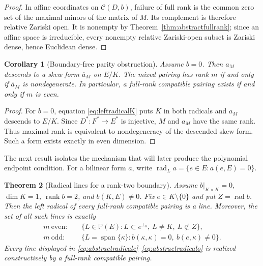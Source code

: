 \documentclass[11pt,a4paper]{article}
\newtheorem{theorem}{Theorem}[section]
\newtheorem{corollary}[theorem]{Corollary}
\theoremstyle{definition}
\theoremstyle{remark}
\newcommand{\Pp}{\mathbb{P}}
\newcommand{\rank}{\operatorname{rank}}
\newcommand{\Rad}{\operatorname{rad}}
\newcommand{\spanof}{\operatorname{span}}
\newcommand{\cC}{\mathcal{C}}
\begin{document}
\begin{proof}
In affine coordinates on $\cC(D,b)$, failure of full rank is the common zero set of the
maximal minors of the matrix of $M$.  Its complement is therefore relative Zariski open.
It is nonempty by Theorem~\ref{thm:abstractfullrank}; since an affine space is irreducible,
every nonempty relative Zariski-open subset is Zariski dense, hence Euclidean dense.
\end{proof}

\begin{corollary}[Boundary-free parity obstruction]\label{cor:parityobstruction}
Assume $b=0$.  Then $a_M$ descends to a skew form $\overline a_M$ on $E/K$.  The mixed
pairing has rank $m$ if and only if $\overline a_M$ is nondegenerate.  In particular, a
full-rank compatible pairing exists if and only if $m$ is even.
\end{corollary}

\begin{proof}
For $b=0$, equation \eqref{eq:leftradicalK} puts $K$ in both radicals and $a_M$ descends to
$E/K$.  Since $D^*:F^*\to E^*$ is injective, $M$ and $a_M$ have the same rank.  Thus maximal
rank is equivalent to nondegeneracy of the descended skew form.  Such a form exists exactly
in even dimension.
\end{proof}

The next result isolates the mechanism that will later produce the polynomial endpoint
condition.  For a bilinear form $a$, write
$\Rad_La=\{e\in E:a(e,E)=0\}$.

\begin{theorem}[Radical lines for a rank-two boundary]
\label{thm:abstractradical}
Assume $b|_{K\times K}=0$, $\dim K=1$, $\rank b=2$, and $b(K,E)\neq0$.  Fix
$e\in K\setminus\{0\}$ and put $Z=\Rad b$.  Then the left radical of every full-rank
compatible pairing is a line.  Moreover, the set of all such lines is exactly
\begin{align}
 m\ \text{even}:\quad&
 \bigl\{L\in\Pp(E):L\subset e^{\perp_b},\ L\neq K,\ L\not\subset Z\bigr\},
 \label{eq:abstractradicale}\\[2mm]
 m\ \text{odd}:\quad&
 \bigl\{L=\spanof\{\kappa\}:b(\kappa,\kappa)=0,\ b(e,\kappa)\neq0\bigr\}.
 \label{eq:abstractradicalo}
\end{align}
Every line displayed in \eqref{eq:abstractradicale}--\eqref{eq:abstractradicalo} is realized
constructively by a full-rank compatible pairing.
\end{theorem}
\end{document}
